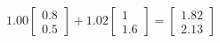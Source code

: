 \documentclass[preview]{standalone}
\begin{document}
\begin{align*}
1.00 \begin{bmatrix} 0.8 \\ 0.5 \end{bmatrix} + 1.02 \begin{bmatrix} 1 \\ 1.6 \end{bmatrix} = \begin{bmatrix} 1.82 \\ 2.13 \end{bmatrix}
\end{align*}
\end{document}
